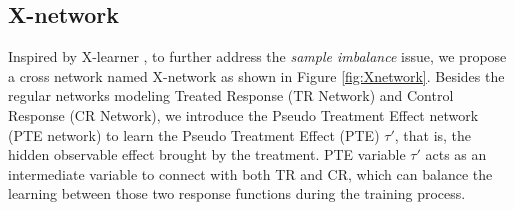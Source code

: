 \documentclass[sigconf]{acmart}
\begin{document}
\vspace{-0.4cm}
\subsection{X-network}
\label{Method Xnetwork}
Inspired by X-learner \cite{Kunzel2019},  to further address the \textit{sample imbalance} issue, we propose a cross network named X-network as shown in Figure \ref{fig:Xnetwork}. Besides the regular networks modeling Treated Response (TR Network) and Control Response (CR Network), we introduce the Pseudo Treatment Effect network (PTE network) to learn the Pseudo Treatment Effect (PTE) ${\tau'}$, that is, the hidden observable effect brought by the treatment. PTE variable ${\tau'}$ acts as an intermediate variable to connect with both TR and CR, which can balance the learning between those two response functions during the training process. 
\end{document}
